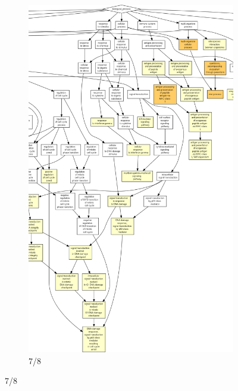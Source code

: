 \begin{figure}[p]
\ContinuedFloat
\begin{subfigure}{\textwidth}
\includegraphics[width=\textwidth]
{Figures/hlc-go-all-graph/hlc-go-all-graph_6.png}
\caption{7/8}
\end{subfigure}
\end{figure}

